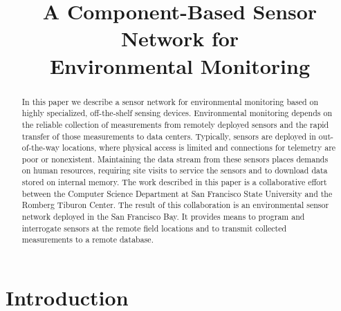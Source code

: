 \documentclass[conference]{IEEEtran}
\begin{document}
\title{A Component-Based Sensor Network for \\ Environmental Monitoring}

\author{
\and
{}
}


\maketitle
\begin{abstract}
  In this paper we describe a sensor network for environmental
  monitoring based on highly specialized, off-the-shelf sensing
  devices.  Environmental monitoring depends on the reliable
  collection of measurements from remotely deployed sensors and the
  rapid transfer of those measurements to data centers. Typically,
  sensors are deployed in out-of-the-way locations, where physical
  access is limited and connections for telemetry are poor or
  nonexistent. Maintaining the data stream from these sensors places
  demands on human resources, requiring site visits to service the
  sensors and to download data stored on internal memory.  The work
  described in this paper is a collaborative effort between the
  Computer Science Department at San Francisco State University and
  the Romberg Tiburon Center. The result of this collaboration is an
  environmental sensor network deployed in the San Francisco Bay. It
  provides means to program and interrogate sensors at the remote
  field locations and to transmit collected measurements to a remote
  database.
\end{abstract}


\section{Introduction}
\end{document}
